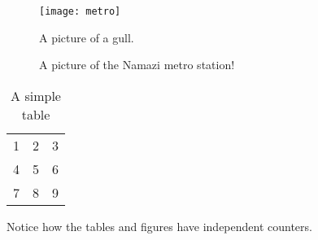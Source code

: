 \documentclass[a4paper,12pt]{article}
\begin{document}
\begin{figure}
  \caption{A picture of a gull.}
  \centering
    \texttt{[image: metro]}
\end{figure}

\begin{figure}
  \centering
  \caption{A picture of the Namazi metro station!}
\end{figure}

\begin{table}
  \centering
    \begin{tabular}{| l c r |}
    \hline
    1 & 2 & 3 \\
    4 & 5 & 6 \\
    7 & 8 & 9 \\
    \hline
    \end{tabular}
  \caption{A simple table}
\end{table}

Notice how the tables and figures
have independent counters.
\end{document}
